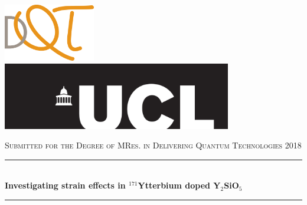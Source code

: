 \documentclass[12pt,oneside]{book}
\begin{document}
\begin{titlepage}

\newcommand{\HRule}{\rule{\linewidth}{0.5mm}} 

\includegraphics[width = 40mm]{DQT_LOGO_cmyk_BIG__1_.png}%
\hfill
\includegraphics[width = 10cm]{University_College_London_logo_svg.png}



\vspace*{3cm} %


\textsc{\large Submitted for the Degree of MRes. in Delivering Quantum Technologies 2018}\\[0.5cm] %


\HRule \\[0.4cm]
\centering
{ \huge \bfseries Investigating strain effects in $^{171}$Ytterbium doped Y$_{2}$SiO$_{5}$}\\[0.5cm] %
\HRule \\[1cm]
 


\end{titlepage}
\end{document}
